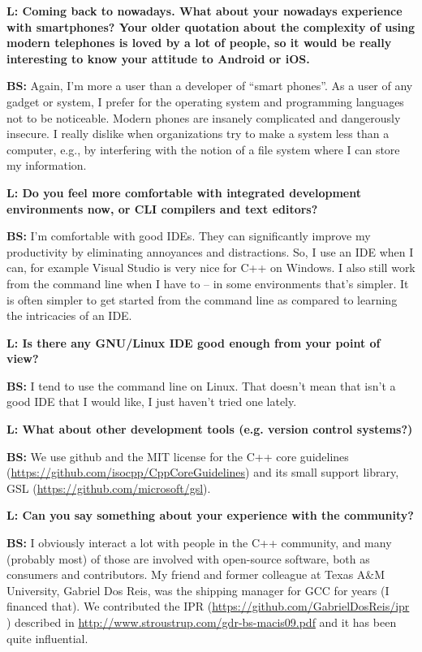 \documentclass[10pt, a5paper]{article}
\begin{document}
\begin{Parallel}[p]{}{}
{{\noindent \bf L: Coming back to nowadays. What about your nowadays experience with smartphones? Your older quotation about the complexity of using modern telephones is loved by a lot of people, so it would be really interesting to know your attitude to Android or iOS.}

{\noindent \bf BS:} Again, I'm more a user than a developer of ``smart phones''. As a user of any gadget or system, I prefer for the operating system and programming languages not to be noticeable. Modern phones are insanely complicated and dangerously insecure. I really dislike when organizations try to make a system less than a computer, e.g., by interfering with the notion of a file system where I can store my information.

{\noindent \bf L: Do you feel more comfortable with integrated development environments now, or CLI compilers and text editors?}

{\noindent \bf BS:} I'm comfortable with good IDEs. They can significantly improve my productivity by eliminating annoyances and distractions. So, I use an IDE when I can, for example Visual Studio is very nice for C++ on Windows. I also still work from the command line when I have to – in some environments that’s simpler. It is often simpler to get started from the command line as compared to learning the intricacies of an IDE. 

{\noindent \bf L: Is there any GNU/Linux IDE good enough from your point of view?}

{\noindent \bf BS:} I tend to use the command line on Linux. That doesn’t mean that isn’t a good IDE that I would like, I just haven’t tried one lately.

{\noindent \bf L: What about other development tools (e.g. version control systems?)}

{\noindent \bf BS:} We use github and the MIT license for the C++ core guidelines (\url{https://github.com/isocpp/CppCoreGuidelines}) and its small support library, GSL (\url{https://github.com/microsoft/gsl}).

{\noindent \bf L: Can you say something about your experience with the community? }

{\noindent \bf BS:} I obviously interact a lot with people in the C++ community, and many (probably most) of those are involved with open-source software, both as consumers and contributors. My friend and former colleague at Texas A\&M University, Gabriel Dos Reis, was the shipping manager for GCC for years (I financed that). We contributed the IPR (\url{https://github.com/GabrielDosReis/ipr} ) described in \url{http://www.stroustrup.com/gdr-bs-macis09.pdf} and it has been quite influential.

}
\end{Parallel}
\end{document}
